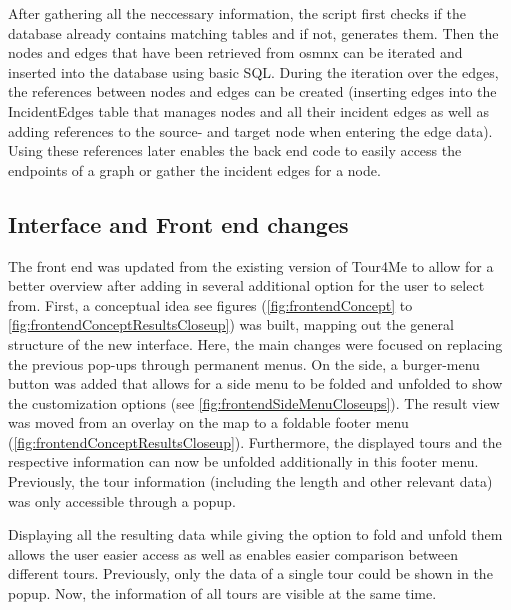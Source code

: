 After gathering all the neccessary information, the script first checks if the database already contains matching tables and if not, generates them.
Then the nodes and edges that have been retrieved from osmnx can be iterated and inserted into the database using basic SQL.
During the iteration over the edges, the references between nodes and edges can be created (inserting edges into the IncidentEdges table that manages nodes and all their incident edges as well as adding references to the source- and target node when entering the edge data).
Using these references later enables the back end code to easily access the endpoints of a graph or gather the incident edges for a node. 



\subsection{Interface and Front end changes}
\label{subsec:interfaceAndFrontendChanges}

The front end was updated from the existing version of Tour4Me to allow for a better overview after adding in several additional option for the user to select from. 
First, a conceptual idea see figures (\ref{fig:frontendConcept} to \ref{fig:frontendConceptResultsCloseup}) was built, mapping out the general structure of the new interface. 
Here, the main changes were focused on replacing the previous pop-ups through permanent menus.
On the side, a burger-menu button was added that allows for a side menu to be folded and unfolded to show the customization options (see \ref{fig:frontendSideMenuCloseups}). 
The result view was moved from an overlay on the map to a foldable footer menu (\ref{fig:frontendConceptResultsCloseup}). 
Furthermore, the displayed tours and the respective information can now be unfolded additionally in this footer menu.
Previously, the tour information (including the length and other relevant data) was only accessible through a popup. 

Displaying all the resulting data while giving the option to fold and unfold them allows the user easier access as well as enables easier comparison between different tours.
Previously, only the data of a single tour could be shown in the popup. 
Now, the information of all tours are visible at the same time. 



